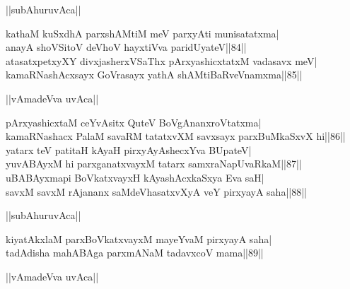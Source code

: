 \documentclass{article}
\begin{document}
\begin{center}
||subAhuruvAca||
\end{center}

kathaM kuSxdhA parxshAMtiM meV parxyAti munisatatxma|\\
anayA shoVSitoV deVhoV hayxtiVva paridUyateV||84||\\
atasatxpetxyXY divxjasherxVSaThx pArxyashicxtatxM vadasavx meV|\\
kamaRNashAcxsayx GoVrasayx yathA shAMtiBaRveVnamxma||85||\\

\begin{center}
||vAmadeVva uvAca||
\end{center}

pArxyashicxtaM ceYvAsitx QuteV BoVgAnanxroVtatxma|\\
kamaRNashacx PalaM savaRM tatatxvXM savxsayx parxBuMkaSxvX hi||86||\\
yatarx teV patitaH kAyaH pirxyAyAshecxYva BUpateV|\\
yuvABAyxM hi parxganatxvayxM tatarx samxraNapUvaRkaM||87||\\
uBABAyxmapi BoVkatxvayxH kAyashAcxkaSxya Eva saH|\\
savxM savxM rAjananx saMdeVhasatxvXyA veY pirxyayA saha||88||\\

\begin{center}
||subAhuruvAca||
\end{center}

kiyatAkxlaM parxBoVkatxvayxM mayeYvaM pirxyayA saha|\\
tadAdisha mahABAga parxmANaM tadavxcoV mama||89||\\

\begin{center}
||vAmadeVva uvAca||
\end{center}
\end{document}
